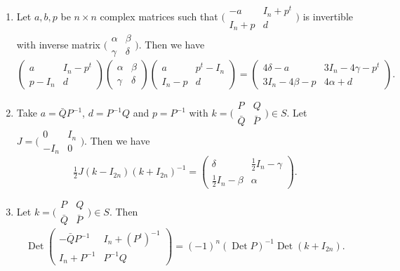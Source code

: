 \documentclass[10pt,a4paper]{amsart}
\DeclareMathOperator{\Det}{Det} \DeclareMathOperator{\Tr}{Tr}
\begin{document}
\begin{lemma} \label{lemmatrices} \begin{enumerate}
\item Let $a,b, p$ be $n\times n$ complex matrices such that
$\bigl(\begin{smallmatrix} -a&I_n+p^t\\
I_n+p&d \end{smallmatrix}\bigr)$ is invertible with inverse matrix $\bigl(\begin{smallmatrix} \alpha &\beta \\
\gamma & \delta  \end{smallmatrix}\bigr)$. Then we have
\begin{equation*}\begin{pmatrix} a&I_n-p^t\\
p-I_n&d \end{pmatrix}\begin{pmatrix} \alpha &\beta \\
\gamma & \delta  \end{pmatrix} \begin{pmatrix} a&p^t-I_n\\
I_n-p&d \end{pmatrix}=\begin{pmatrix}4\delta -a&3I_n-4\gamma -p^t\\
3I_n-4\beta-p&4\alpha+d \end{pmatrix}.
\end{equation*}
\item Take $a={\bar Q}P^{-1}$, $d=P^{-1}Q$ and $p=P^{-1}$ with 
$k=\bigl(\begin{smallmatrix} P&Q\\
{\bar Q}&{\bar P} \end{smallmatrix}\bigr)\in S$. Let $J=\bigl(\begin{smallmatrix} 0&I_n\\
-I_n&0 \end{smallmatrix}\bigr)$. Then we have
\begin{equation*}\tfrac{1}{2}J(k-I_{2n})(k+I_{2n})^{-1}=\begin{pmatrix}\delta &\tfrac{1}{2}I_n-\gamma\\
\tfrac{1}{2}I_n-\beta&\alpha \end{pmatrix}.\end{equation*}
\item Let $k=\bigl(\begin{smallmatrix} P&Q\\
{\bar Q}&{\bar P} \end{smallmatrix}\bigr)\in S$. Then
\begin{equation*}\Det \begin{pmatrix}-{\bar Q}P^{-1} &I_n+(P^t)^{-1}\\
I_n+P^{-1}&P^{-1}Q \end{pmatrix}=(-1)^n(\Det P)^{-1}\Det(k+I_{2n}).
\end{equation*}\end{enumerate}
\end{lemma}
\end{document}
